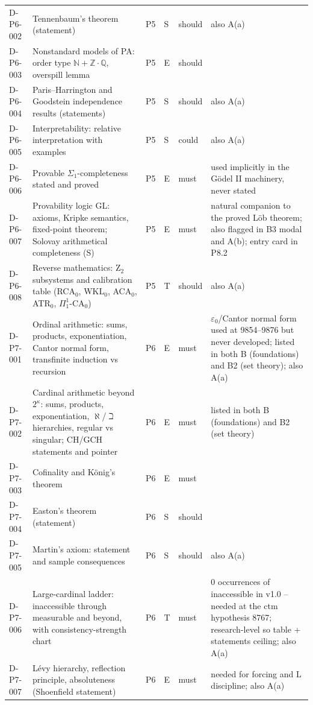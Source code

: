 \begin{longtable}{@{}p{0.62in}p{2.6in}p{0.75in}p{0.22in}p{0.42in}p{1.85in}@{}}
D-P6-002 & Tennenbaum's theorem (statement) & P5 & S & should & also A(a) \\
D-P6-003 & Nonstandard models of PA: order type \(\mathbb{N}+\mathbb{Z}\cdot\mathbb{Q}\), overspill lemma & P5 & E & should &  \\
D-P6-004 & Paris--Harrington and Goodstein independence results (statements) & P5 & S & should & also A(a) \\
D-P6-005 & Interpretability: relative interpretation with examples & P5 & S & could & also A(a) \\
D-P6-006 & Provable \(\Sigma_1\)-completeness stated and proved & P5 & E & must & used implicitly in the G\"odel II machinery, never stated \\
D-P6-007 & Provability logic GL: axioms, Kripke semantics, fixed-point theorem; Solovay arithmetical completeness (S) & P5 & E & must & natural companion to the proved L\"ob theorem; also flagged in B3 modal and A(b); entry card in P8.2 \\
D-P6-008 & Reverse mathematics: Z\(_2\) subsystems and calibration table (RCA\(_0\), WKL\(_0\), ACA\(_0\), ATR\(_0\), \(\Pi^1_1\)-CA\(_0\)) & P5 & T & should & also A(a) \\
D-P7-001 & Ordinal arithmetic: sums, products, exponentiation, Cantor normal form, transfinite induction vs recursion & P6 & E & must & \(\varepsilon_0\)/Cantor normal form used at 9854--9876 but never developed; listed in both B (foundations) and B2 (set theory); also A(a) \\
D-P7-002 & Cardinal arithmetic beyond \(2^\kappa\): sums, products, exponentiation, \(\aleph\)/\(\beth\) hierarchies, regular vs singular; CH/GCH statements and pointer & P6 & E & must & listed in both B (foundations) and B2 (set theory) \\
D-P7-003 & Cofinality and K\"onig's theorem & P6 & E & must &  \\
D-P7-004 & Easton's theorem (statement) & P6 & S & should &  \\
D-P7-005 & Martin's axiom: statement and sample consequences & P6 & S & should & also A(a) \\
D-P7-006 & Large-cardinal ladder: inaccessible through measurable and beyond, with consistency-strength chart & P6 & T & must & 0 occurrences of inaccessible in v1.0 -- needed at the ctm hypothesis 8767; research-level so table + statements ceiling; also A(a) \\
D-P7-007 & L\'evy hierarchy, reflection principle, absoluteness (Shoenfield statement) & P6 & E & must & needed for forcing and L discipline; also A(a) \\

\end{longtable}
